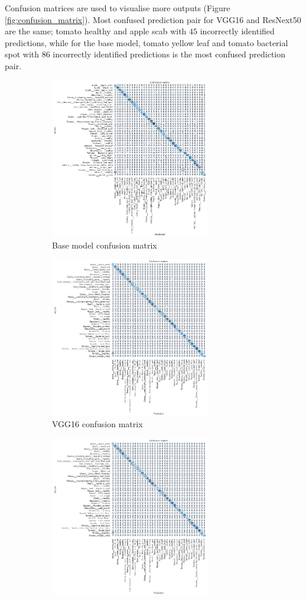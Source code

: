 \documentclass[12pt]{report}
\numberwithin{equation}{section}
\begin{document}
Confusion matrices are used to visualise more outputs (Figure \ref{fig:confusion_matrix}). Most confused prediction pair for VGG16 and ResNext50 are the same; tomato healthy and apple scab with $45$ incorrectly identified predictions, while for the base model, tomato yellow leaf and tomato bacterial spot with $86$ incorrectly identified predictions is the most confused prediction pair.  

\begin{figure}[H]
\begin{subfigure}[t]{.5\textwidth}
\centering
\includegraphics[width=7cm,height=7cm]{png/base_confusion_matrix.png}
\caption{Base model confusion matrix}
\label{subfig:base_confusion}
\end{subfigure}
\hfill
\begin{subfigure}[t]{.5\textwidth}
\centering
\includegraphics[width=7cm,height=7cm]{png/vgg16_confusion_matrix.png}
\caption{VGG16 confusion matrix}
\label{subfig:vgg_confusion}
\end{subfigure}
\medskip
\begin{subfigure}[t]{\textwidth}
\centering
\includegraphics[width=7cm,height=7cm]{png/resnext50_confusion_matrix.png}

\end{subfigure}
\end{figure}
\end{document}
